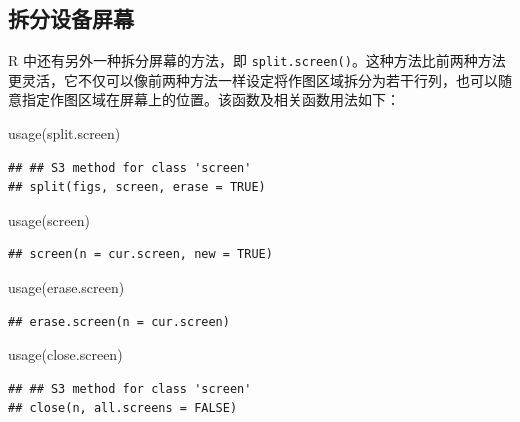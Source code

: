\documentclass[
  b5paper,
  UTF8,twoside]{book}
\newenvironment{Shaded}{\begin{snugshade}}{\end{snugshade}}
\newcommand{\FunctionTok}[1]{\textcolor[rgb]{0.00,0.00,0.00}{#1}}
\newcommand{\NormalTok}[1]{#1}
\begin{document}
\hypertarget{ux62c6ux5206ux8bbeux5907ux5c4fux5e55}{%
\subsection{拆分设备屏幕}\label{ux62c6ux5206ux8bbeux5907ux5c4fux5e55}}

R 中还有另外一种拆分屏幕的方法，即 \texttt{split.screen()}。这种方法比前两种方法更灵活，它不仅可以像前两种方法一样设定将作图区域拆分为若干行列，也可以随意指定作图区域在屏幕上的位置。该函数及相关函数用法如下：

\begin{Shaded}
\begin{Highlighting}[]
\FunctionTok{usage}\NormalTok{(split.screen)}
\end{Highlighting}
\end{Shaded}

\begin{verbatim}
## ## S3 method for class 'screen'
## split(figs, screen, erase = TRUE)
\end{verbatim}

\begin{Shaded}
\begin{Highlighting}[]
\FunctionTok{usage}\NormalTok{(screen)}
\end{Highlighting}
\end{Shaded}

\begin{verbatim}
## screen(n = cur.screen, new = TRUE)
\end{verbatim}

\begin{Shaded}
\begin{Highlighting}[]
\FunctionTok{usage}\NormalTok{(erase.screen)}
\end{Highlighting}
\end{Shaded}

\begin{verbatim}
## erase.screen(n = cur.screen)
\end{verbatim}

\begin{Shaded}
\begin{Highlighting}[]
\FunctionTok{usage}\NormalTok{(close.screen)}
\end{Highlighting}
\end{Shaded}

\begin{verbatim}
## ## S3 method for class 'screen'
## close(n, all.screens = FALSE)
\end{verbatim}
\end{document}
